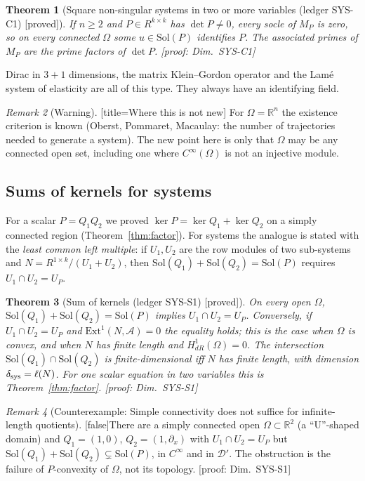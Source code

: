 \documentclass[11pt]{article}
\theoremstyle{plain}
\newtheorem{theorem}{Theorem}[section]
\theoremstyle{definition}
\theoremstyle{remark}
\newtheorem{remark}[theorem]{Remark}
\newcommand{\R}{\mathbb{R}}
\newcommand{\badge}[2]{\textcolor{#1}{\textsf{\footnotesize[#2]}}}
\newcommand{\proved}[1][]{\badge{cC}{proved#1}}
\newcommand{\falsest}{\badge{cB}{false}}
\newcommand{\led}[1]{\textcolor{cG}{\textsf{\footnotesize(ledger #1)}}}
\newenvironment{caution}{\begin{remark}[Warning]}{\end{remark}}
\newcommand{\dimref}[1]{\textsf{\footnotesize[proof: Dim.~#1]}}
\newenvironment{falsebox}[2][]{\begin{remark}[Counterexample: #2]}{\end{remark}}
\begin{document}
\begin{theorem}[{Square non-singular systems in two or more variables \led{SYS-C1} \proved}]\label{thm:sysc1}
If $n\ge2$ and $P\in R^{k\times k}$ has $\det P\ne0$, every socle of $M_P$ is zero, so on every connected $\Omega$ some $u\in\mathrm{Sol}(P)$ identifies $P$. The associated primes of $M_P$ are the prime factors of $\det P$.
\dimref{SYS-C1}
\end{theorem}

Dirac in $3+1$ dimensions, the matrix Klein--Gordon operator and the Lam\'e system of elasticity are all of this type. They always have an identifying field.

\begin{caution}[title=Where this is not new]
For $\Omega=\R^n$ the existence criterion is known (Oberst, Pommaret, Macaulay: the number of trajectories needed to generate a system). The new point here is only that $\Omega$ may be any connected open set, including one where $C^\infty(\Omega)$ is not an injective module.
\end{caution}

\subsection{Sums of kernels for systems}

For a scalar $P=Q_1Q_2$ we proved $\ker P=\ker Q_1+\ker Q_2$ on a simply connected region (Theorem~\ref{thm:factor}). For systems the analogue is stated with the \emph{least common left multiple}: if $U_1,U_2$ are the row modules of two sub-systems and $N=R^{1\times k}/(U_1+U_2)$, then $\mathrm{Sol}(Q_1)+\mathrm{Sol}(Q_2)=\mathrm{Sol}(P)$ requires $U_1\cap U_2=U_P$.

\begin{theorem}[{Sum of kernels \led{SYS-S1} \proved}]\label{thm:syss1}
On every open $\Omega$, $\mathrm{Sol}(Q_1)+\mathrm{Sol}(Q_2)=\mathrm{Sol}(P)$ implies $U_1\cap U_2=U_P$. Conversely, if $U_1\cap U_2=U_P$ and $\mathrm{Ext}^1(N,\mathcal A)=0$ the equality holds; this is the case when $\Omega$ is convex, and when $N$ has finite length and $H^1_{dR}(\Omega)=0$. The intersection $\mathrm{Sol}(Q_1)\cap\mathrm{Sol}(Q_2)$ is finite-dimensional iff $N$ has finite length, with dimension $\delta_{\rm sys}=\ell(N)$. For one scalar equation in two variables this is Theorem~\ref{thm:factor}.
\dimref{SYS-S1}
\end{theorem}

\begin{falsebox}{Simple connectivity does not suffice for infinite-length quotients}{\falsest}\label{cex:syss1}
There are a simply connected open $\Omega\subset\R^2$ (a ``U''-shaped domain) and $Q_1=(1,0)$, $Q_2=(1,\partial_x)$ with $U_1\cap U_2=U_P$ but $\mathrm{Sol}(Q_1)+\mathrm{Sol}(Q_2)\subsetneq\mathrm{Sol}(P)$, in $C^\infty$ and in $\mathcal D'$. The obstruction is the failure of $P$-convexity of $\Omega$, not its topology.
\dimref{SYS-S1}
\end{falsebox}
\end{document}
